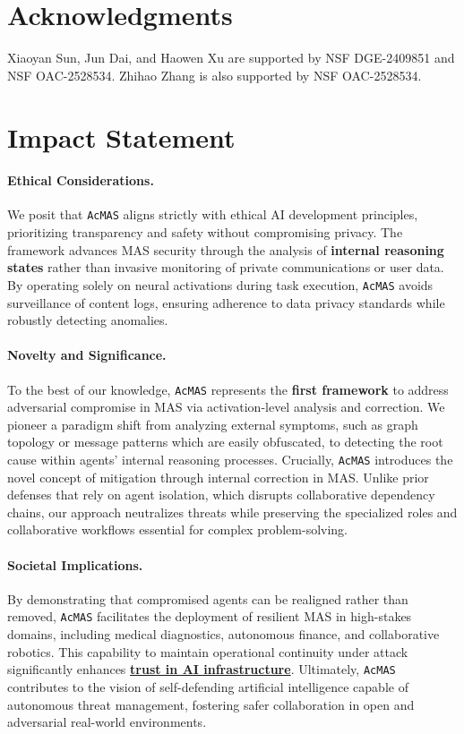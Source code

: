 \documentclass{article}
\newcommand{\app}{\texttt{AcMAS}}
\theoremstyle{plain}
\theoremstyle{definition}
\theoremstyle{remark}
\begin{document}
\section*{Acknowledgments}
Xiaoyan Sun, Jun Dai, and Haowen Xu are supported by NSF DGE-2409851 and NSF OAC-2528534. Zhihao Zhang is also supported by NSF OAC-2528534.



\newpage


\section*{Impact Statement}
\paragraph{Ethical Considerations.}
We posit that \app{} aligns strictly with ethical AI development principles, prioritizing transparency and safety without compromising privacy. The framework advances MAS security through the analysis of \textbf{internal reasoning states} rather than invasive monitoring of private communications or user data. By operating solely on neural activations during task execution, \app{} avoids surveillance of content logs, ensuring adherence to data privacy standards while robustly detecting anomalies.

\paragraph{Novelty and Significance.}
To the best of our knowledge, \app{} represents the \textbf{first framework} to address adversarial compromise in MAS via activation-level analysis and correction. We pioneer a paradigm shift from analyzing external symptoms, such as graph topology or message patterns which are easily obfuscated, to detecting the root cause within agents' internal reasoning processes. Crucially, \app{} introduces the novel concept of mitigation through internal correction in MAS. Unlike prior defenses that rely on agent isolation, which disrupts collaborative dependency chains, our approach neutralizes threats while preserving the specialized roles and collaborative workflows essential for complex problem-solving.

\paragraph{Societal Implications.}
By demonstrating that compromised agents can be realigned rather than removed, \app{} facilitates the deployment of resilient MAS in high-stakes domains, including medical diagnostics, autonomous finance, and collaborative robotics. This capability to maintain operational continuity under attack significantly enhances \underline{\textbf{trust in AI infrastructure}}. Ultimately, \app{} contributes to the vision of self-defending artificial intelligence capable of autonomous threat management, fostering safer collaboration in open and adversarial real-world environments.
\end{document}
